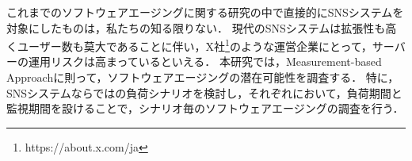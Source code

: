 \documentclass[twoside,twocolumn,10pt]{jarticle}  %
\begin{document}
これまでのソフトウェアエージングに関する研究の中で直接的にSNSシステムを対象にしたものは，私たちの知る限りない．
現代のSNSシステムは拡張性も高くユーザー数も莫大であることに伴い，X社\footnote{https://about.x.com/ja}のような運営企業にとって，サーバーの運用リスクは高まっているといえる．
本研究では，Measurement-based Approach\cite{Dohi2020Handbook}に則って，ソフトウェアエージングの潜在可能性を調査する．
特に，SNSシステムならではの負荷シナリオを検討し，それぞれにおいて，負荷期間と監視期間\cite{Torquato2018SWAREa}を設けることで，シナリオ毎のソフトウェアエージングの調査を行う．
\end{document}
